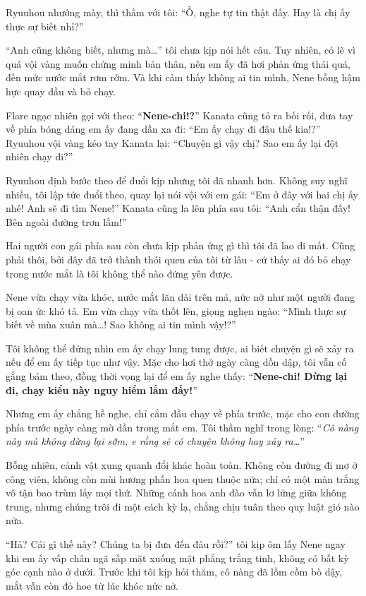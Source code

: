 \documentclass[../main.tex]{subfiles}
\begin{document}
Ryuuhou nhướng mày, thì thầm với tôi: ``Ồ, nghe tự tin thật đấy. Hay là chị ấy thực sự biết nhỉ?''

``Anh cũng không biết, nhưng mà\dots'' tôi chưa kịp nói hết câu. Tuy nhiên, có lẽ vì quá vội vàng muốn chứng minh bản thân, nên em ấy đã hơi phản ứng thái quá, đến mức nước mắt rơm rớm. Và khi cảm thấy không ai tin mình, Nene bỗng hậm hực quay đầu và bỏ chạy.


Flare ngạc nhiên gọi với theo: ``\textbf{Nene-chi!?}'' Kanata cũng tỏ ra bối rối, đưa tay về phía bóng dáng em ấy đang dần xa đi: ``Em ấy chạy đi đâu thế kia!?''
Ryuuhou vội vàng kéo tay Kanata lại: ``Chuyện gì vậy chị? Sao em ấy lại đột nhiên chạy đi?''

Ryuuhou định bước theo để đuổi kịp nhưng tôi đã nhanh hơn. Không suy nghĩ nhiều, tôi lập tức đuổi theo, quay lại nói vội với em gái: ``Em ở đây với hai chị ấy nhé! Anh sẽ đi tìm Nene!'' Kanata cũng la lên phía sau tôi: ``Anh cẩn thận đấy! Bên ngoài đường trơn lắm!''

Hai người con gái phía sau còn chưa kịp phản ứng gì thì tôi đã lao đi mất. Cũng phải thôi, bởi đây đã trở thành thói quen của tôi từ lâu - cứ thấy ai đó bỏ chạy trong nước mắt là tôi không thể nào đứng yên được.

Nene vừa chạy vừa khóc, nước mắt lăn dài trên má, nức nở như một người đang bị oan ức khó tả. Em vừa chạy vừa thốt lên, giọng nghẹn ngào: ``Mình thực sự biết về mùa xuân mà\dots! Sao không ai tin mình vậy!?''

Tôi không thể đứng nhìn em ấy chạy lung tung được, ai biết chuyện gì sẽ xảy ra nếu để em ấy tiếp tục như vậy. Mặc cho hơi thở ngày càng dồn dập, tôi vẫn cố gắng bám theo, đồng thời vọng lại để em ấy nghe thấy: ``\textbf{Nene-chi! Dừng lại đi, chạy kiểu này nguy hiểm lắm đấy!}''

Nhưng em ấy chẳng hề nghe, chỉ cắm đầu chạy về phía trước, mặc cho con đường phía trước ngày càng mờ dần trong mắt em. Tôi thầm nghĩ trong lòng: ``\textit{Cô nàng này mà không dừng lại sớm, e rằng sẽ có chuyện không hay xảy ra\dots}''

\ct

Bỗng nhiên, cảnh vật xung quanh đổi khác hoàn toàn. Không còn đường đi mơ ở công viên, không còn mùi hương phấn hoa quen thuộc nữa; chỉ có một màn trắng vô tận bao trùm lấy mọi thứ. Những cánh hoa anh đào vẫn lơ lửng giữa không trung, nhưng chúng trôi đi một cách kỳ lạ, chẳng chịu tuân theo quy luật gió nào nữa.

``Hả? Cái gì thế này? Chúng ta bị đưa đến đâu rồi?'' tôi kịp ôm lấy Nene ngay khi em ấy vấp chân ngã sấp mặt xuống mặt phẳng trắng tinh, không có bất kỳ góc cạnh nào ở dưới. Trước khi tôi kịp hỏi thăm, cô nàng đã lồm cồm bò dậy, mắt vẫn còn đỏ hoe từ lúc khóc nức nở.
\end{document}
